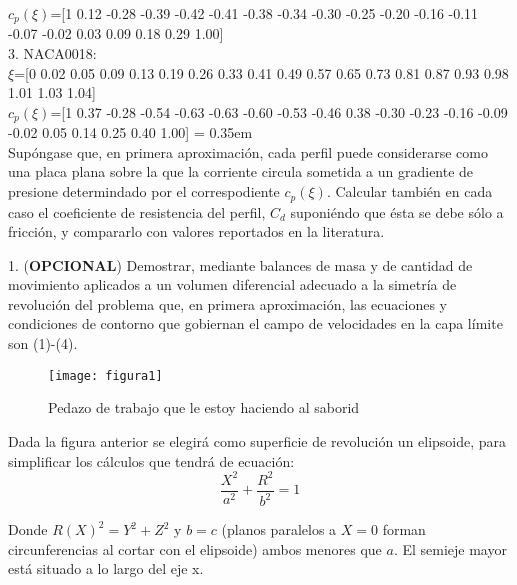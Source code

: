 \documentclass[11pt,a4paper]{article}
\begin{document}
$c_{p}(\xi)$=[1 0.12 -0.28 -0.39 -0.42 -0.41 -0.38 -0.34 -0.30 -0.25 -0.20 -0.16 -0.11 -0.07 -0.02 0.03 0.09 0.18 0.29 1.00]
\\

3. NACA0018:
\\

\hspace{1cm}
$\xi$=[0 0.02 0.05 0.09 0.13 0.19 0.26 0.33 0.41 0.49 0.57 0.65 0.73 0.81 0.87 0.93 0.98 1.01 1.03 1.04]
\\

$c_{p}(\xi)$=[1 0.37 -0.28 -0.54 -0.63 -0.63 -0.60 -0.53 -0.46 0.38 -0.30 -0.23 -0.16 -0.09 -0.02 0.05 0.14 0.25 0.40 1.00]
\font= 0.35em
\hspace{1cm}
\\

Supóngase que, en primera aproximación, cada perfil puede considerarse como una placa plana sobre la que la corriente circula sometida a un gradiente de presione determindado por el correspodiente $c_{p}(\xi)$. Calcular también en cada caso el coeficiente de resistencia del perfil, $C_{d}$ suponiéndo que ésta se debe sólo a fricción, y compararlo con valores reportados en la literatura.

\newpage

1. (\textbf {OPCIONAL}) Demostrar, mediante balances de masa y de cantidad de movimiento aplicados a un volumen diferencial adecuado a la simetría de revolución del problema que, en primera aproximación, las ecuaciones y condiciones de contorno que gobiernan el campo de velocidades en la capa límite son (1)-(4).
\vspace{1cm}

\begin{figure}[hb]
  \centering
  \texttt{[image: figura1]}
  \caption{Pedazo de trabajo que le estoy haciendo al saborid}
\end{figure}


Dada la figura anterior se elegirá como superficie de revolución un elipsoide, para simplificar los cálculos que tendrá de ecuación:
\[\frac{X^{2}}{a^2}+\frac{R^{2}}{b^2}=1\]



Donde $R(X)^{2} = Y^{2}+Z^{2}$ y $b = c$ (planos paralelos a $X=0$ forman circunferencias al cortar con el elipsoide) ambos menores que $a$. El semieje mayor está situado a lo largo del eje x.
\end{document}
